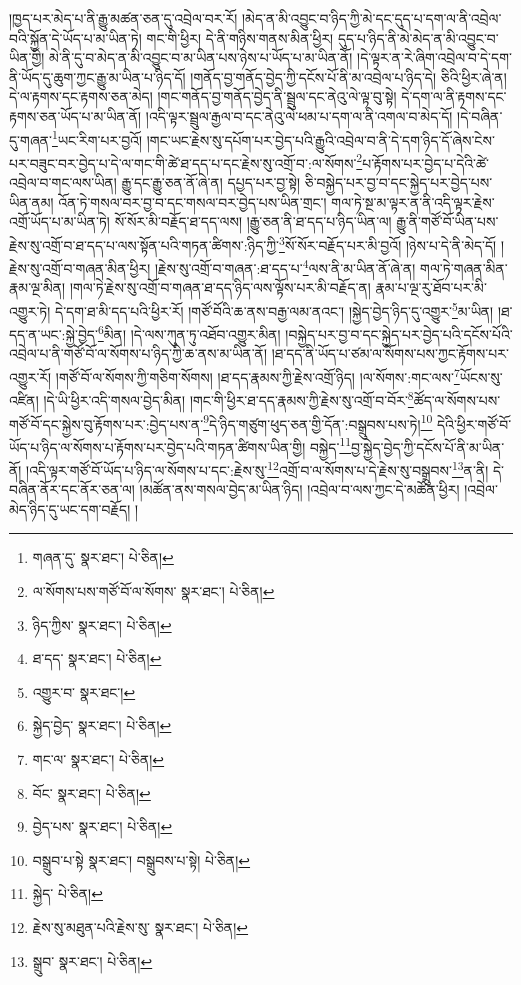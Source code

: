 །ཁྱད་པར་མེད་པ་ནི་རྒྱུ་མཚན་ཅན་དུ་འབྲེལ་བར་རོ། །མེད་ན་མི་འབྱུང་བ་ཉིད་ཀྱི་མེ་དང་དུད་པ་དག་ལ་ནི་འབྲེལ་བའི་སྐྱོན་དེ་ཡོད་པ་མ་ཡིན་ཏེ། གང་གི་ཕྱིར། དེ་ནི་གཉིས་གནས་མིན་ཕྱིར། དུད་པ་ཉིད་ནི་མེ་མེད་ན་མི་འབྱུང་བ་ཡིན་གྱི། མེ་ནི་དུ་བ་མེད་ན་མི་འབྱུང་བ་མ་ཡིན་པས་ཉེས་པ་ཡོད་པ་མ་ཡིན་ནོ། །དེ་ལྟར་ན་རེ་ཞིག་འབྲེལ་བ་དེ་དག་ནི་ཡོད་དུ་ཆུག་ཀྱང་རྒྱུ་མ་ཡིན་པ་ཉིད་དོ། །གནོད་བྱ་གནོད་བྱེད་ཀྱི་དངོས་པོ་ནི་མ་འབྲེལ་པ་ཉིད་དེ། ཅིའི་ཕྱིར་ཞེ་ན། དེ་ལ་རྟགས་དང་རྟགས་ཅན་མེད། །གང་གནོད་བྱ་གནོད་བྱེད་ནི་སྦྲུལ་དང་ནེའུ་ལེ་ལྟ་བུ་སྟེ། དེ་དག་ལ་ནི་རྟགས་དང་རྟགས་ཅན་ཡོད་པ་མ་ཡིན་ནོ། །འདི་ལྟར་སྦྲུལ་རྒྱལ་བ་དང་ནེའུ་ལེ་ཕམ་པ་དག་ལ་ནི་འགལ་བ་མེད་དོ། །དེ་བཞིན་དུ་གཞན་\footnote{གཞན་དུ་  སྣར་ཐང་།  པེ་ཅིན། }ཡང་རིག་པར་བྱའོ། །གང་ཡང་རྗེས་སུ་དཔོག་པར་བྱེད་པའི་རྒྱུའི་འབྲེལ་བ་ནི་དེ་དག་ཉིད་དོ་ཞེས་ངེས་པར་བཟུང་བར་བྱེད་པ་དེ་ལ་གང་གི་ཚེ་ཐ་དད་པ་དང་རྗེས་སུ་འགྲོ་བ་:ལ་སོགས་\footnote{ལ་སོགས་པས་གཙོ་བོ་ལ་སོགས་  སྣར་ཐང་།  པེ་ཅིན། }པ་རྟོགས་པར་བྱེད་པ་དེའི་ཚེ་འབྲེལ་བ་གང་ལས་ཡིན། རྒྱུ་དང་རྒྱུ་ཅན་ནོ་ཞེ་ན། དཔྱད་པར་བྱ་སྟེ། ཅི་བསྐྱེད་པར་བྱ་བ་དང་སྐྱེད་པར་བྱེད་པས་ཡིན་ནམ། འོན་ཏེ་གསལ་བར་བྱ་བ་དང་གསལ་བར་བྱེད་པས་ཡིན་གྲང་། གལ་ཏེ་སྔ་མ་ལྟར་ན་ནི་འདི་ལྟར་རྗེས་འགྲོ་ཡོད་པ་མ་ཡིན་ཏེ། སོ་སོར་མི་བརྗོད་ཐ་དད་ལས། །རྒྱུ་ཅན་ནི་ཐ་དད་པ་ཉིད་ཡིན་ལ། རྒྱུ་ནི་གཙོ་བོ་ཡིན་པས་རྗེས་སུ་འགྲོ་བ་ཐ་དད་པ་ལས་སྟོན་པའི་གཏན་ཚིགས་:ཉིད་ཀྱི་\footnote{ཉིད་ཀྱིས་  སྣར་ཐང་།  པེ་ཅིན། }སོ་སོར་བརྗོད་པར་མི་བྱའོ། །ཉེས་པ་དེ་ནི་མེད་དོ། །རྗེས་སུ་འགྲོ་བ་གཞན་མིན་ཕྱིར། །རྗེས་སུ་འགྲོ་བ་གཞན་:ཐ་དད་པ་\footnote{ཐ་དད་  སྣར་ཐང་།  པེ་ཅིན། }ལས་ནི་མ་ཡིན་ནོ་ཞེ་ན། གལ་ཏེ་གཞན་མིན་རྣམ་ལྔ་མིན། །གལ་ཏེ་རྗེས་སུ་འགྲོ་བ་གཞན་ཐ་དད་ཉིད་ལས་ལྟོས་པར་མི་བརྗོད་ན། རྣམ་པ་ལྔ་རུ་ཐོབ་པར་མི་འགྱུར་ཏེ། དེ་དག་ཐ་མི་དད་པའི་ཕྱིར་རོ། །གཙོ་བོའི་ཆ་ནས་བརྒྱ་ལམ་ནའང་། །སྐྱེད་བྱེད་ཉིད་དུ་འགྱུར་\footnote{འགྱུར་བ་  སྣར་ཐང་། }མ་ཡིན། །ཐ་དད་ན་ཡང་:སྐྱེ་བྱེད་\footnote{སྐྱེད་བྱེད་  སྣར་ཐང་།  པེ་ཅིན། }མིན། །དེ་ལས་ཀུན་ཏུ་འཐོབ་འགྱུར་མིན། །བསྐྱེད་པར་བྱ་བ་དང་སྐྱེད་པར་བྱེད་པའི་དངོས་པོའི་འབྲེལ་པ་ནི་གཙོ་བོ་ལ་སོགས་པ་ཉིད་ཀྱི་ཆ་ནས་མ་ཡིན་ནོ། །ཐ་དད་ནི་ཡོད་པ་ཙམ་ལ་སོགས་པས་ཀྱང་རྟོགས་པར་འགྱུར་རོ། །གཙོ་བོ་ལ་སོགས་ཀྱི་གཅིག་སོགས། །ཐ་དད་རྣམས་ཀྱི་རྗེས་འགྲོ་ཉིད། །ལ་སོགས་:གང་ལས་\footnote{གང་ལ་  སྣར་ཐང་།  པེ་ཅིན། }ཡོངས་སུ་འཛིན། །དེ་ཡི་ཕྱིར་འདི་གསལ་བྱེད་མིན། །གང་གི་ཕྱིར་ཐ་དད་རྣམས་ཀྱི་རྗེས་སུ་འགྲོ་བ་བོར་\footnote{བོང་  སྣར་ཐང་།  པེ་ཅིན། }ཚོད་ལ་སོགས་པས་གཙོ་བོ་དང་སྐྱེས་བུ་རྟོགས་པར་:བྱེད་པས་ན་\footnote{བྱེད་པས་  སྣར་ཐང་།  པེ་ཅིན། }དེ་ཉིད་གཙུག་ཕུད་ཅན་གྱི་དོན་:བསྒྲུབས་པས་ཏེ།\footnote{བསྒྲུབ་པ་སྟེ  སྣར་ཐང་། བསྒྲུབས་པ་སྟེ།  པེ་ཅིན། } དེའི་ཕྱིར་གཙོ་བོ་ཡོད་པ་ཉིད་ལ་སོགས་པ་རྟོགས་པར་བྱེད་པའི་གཏན་ཚིགས་ཡིན་གྱི། བསྐྱེད་\footnote{སྐྱེད་  པེ་ཅིན། }བྱ་སྐྱེད་བྱེད་ཀྱི་དངོས་པོ་ནི་མ་ཡིན་ནོ། །འདི་ལྟར་གཙོ་བོ་ཡོད་པ་ཉིད་ལ་སོགས་པ་དང་:རྗེས་སུ་\footnote{རྗེས་སུ་མཐུན་པའི་རྗེས་སུ་  སྣར་ཐང་།  པེ་ཅིན། }འགྲོ་བ་ལ་སོགས་པ་དེ་རྗེས་སུ་བསྒྲུབས་\footnote{སྒྲུབ་  སྣར་ཐང་།  པེ་ཅིན། }ན་ནི། དེ་བཞིན་ནོར་དང་ནོར་ཅན་ལ། །མཚོན་ནས་གསལ་བྱེད་མ་ཡིན་ཉིད། །འབྲེལ་བ་ལས་ཀྱང་དེ་མཚོན་ཕྱིར། །འབྲེལ་མེད་ཉིད་དུ་ཡང་དག་བརྗོད། །
